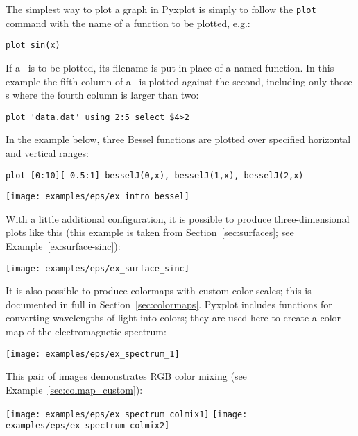 
The simplest way to plot a graph in Pyxplot is simply to follow the {\tt plot}
command with the name of a function to be plotted, e.g.:

\begin{verbatim}
plot sin(x)
\end{verbatim}

\noindent If a \datafile\ is to be plotted, its filename is put in place of a
named function. In this example the fifth column of a \datafile\ is plotted
against the second, including only those \datapoint s where the fourth column
is larger than two:

\begin{verbatim}
plot 'data.dat' using 2:5 select $4>2
\end{verbatim}

In the example below, three Bessel functions are plotted over specified
horizontal and vertical ranges:

\begin{verbatim}
plot [0:10][-0.5:1] besselJ(0,x), besselJ(1,x), besselJ(2,x)
\end{verbatim}
\begin{center}
\texttt{[image: examples/eps/ex\_intro\_bessel]}
\end{center}

\noindent With a little additional configuration, it is possible to produce
three-dimensional plots like this (this example is taken from
Section~\ref{sec:surfaces}; see Example~\ref{ex:surface-sinc}):

\begin{center}
\texttt{[image: examples/eps/ex\_surface\_sinc]}
\end{center}

\noindent It is also possible to produce colormaps with custom color scales;
this is documented in full in Section~\ref{sec:colormaps}.  Pyxplot includes
functions for converting wavelengths of light into colors; they are used here
to create a color map of the electromagnetic spectrum:

\begin{center}
\texttt{[image: examples/eps/ex\_spectrum\_1]}
\end{center}

\noindent This pair of images demonstrates RGB color mixing (see
Example~\ref{sec:colmap_custom}):

\begin{center}
\texttt{[image: examples/eps/ex\_spectrum\_colmix1]}
\texttt{[image: examples/eps/ex\_spectrum\_colmix2]}
\end{center}

